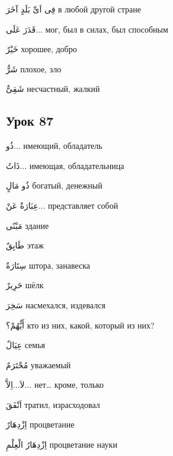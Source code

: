 \documentclass[a5paper]{article}
\newcommand\textstyleDropCaps[1]{#1}
\newcommand\textstyleCaptioncharacters[1]{#1}
\begin{document}
\textstyleCaptioncharacters{فِى اَىِّ بَلَدٍ آخَرَ }\textstyleDropCaps{в лю­бой другой стране‎}

\textstyleCaptioncharacters{قَدَرَ عَلَى... }\textstyleDropCaps{мог, был в си­лах, был способным‎}

\textstyleCaptioncharacters{خَيْرٌ }\textstyleDropCaps{хорошее, добро‎}

\textstyleCaptioncharacters{شَرٌّ }\textstyleDropCaps{плохое, зло‎}

\textstyleCaptioncharacters{شَقِىٌّ }\textstyleDropCaps{несчастный, жал­кий‎}

\subsection[Урок 87‎]{\textstyleDropCaps{Урок 87‎}}
\textstyleCaptioncharacters{ذُو... }\textstyleDropCaps{имеющий, облада­тель‎}

\textstyleCaptioncharacters{ذَاتُ... }\textstyleDropCaps{имеющая, облада­тельница‎}

\textstyleCaptioncharacters{ذُو مَالٍ }\textstyleDropCaps{богатый, денеж­ный‎}

\textstyleCaptioncharacters{عِبَارَةٌ عَنْ... }\textstyleDropCaps{представ­ляет собой‎}

\textstyleCaptioncharacters{مَبْنًى }\textstyleDropCaps{здание‎}

\textstyleCaptioncharacters{طَابِقٌ }\textstyleDropCaps{этаж‎}

\textstyleCaptioncharacters{سِتَارَةٌ }\textstyleDropCaps{штора, занавеска‎}

\textstyleCaptioncharacters{حَرِيرٌ }\textstyleDropCaps{шёлк‎}

\textstyleCaptioncharacters{سَخِرَ }\textstyleDropCaps{насмехался, изде­вался‎}

\textstyleCaptioncharacters{أَيُّهُمْ؟ }\textstyleDropCaps{кто из них, какой, который из них?‎}

\textstyleCaptioncharacters{عِيَالٌ }\textstyleDropCaps{семья‎}

\textstyleCaptioncharacters{مُحْتَرَمٌ }\textstyleDropCaps{уважаемый‎}

\textstyleCaptioncharacters{لاَ...اِلاَّ... }\textstyleDropCaps{нет… кроме, только‎}

\textstyleCaptioncharacters{اَنْفَقَ }\textstyleDropCaps{тратил, израсходовал‎}

\textstyleCaptioncharacters{اِزْدِهَارٌ }\textstyleDropCaps{процветание‎}

\textstyleCaptioncharacters{اِزْدِهَارُ الْعِلْمِ }\textstyleDropCaps{процвета­ние науки‎}
\end{document}
